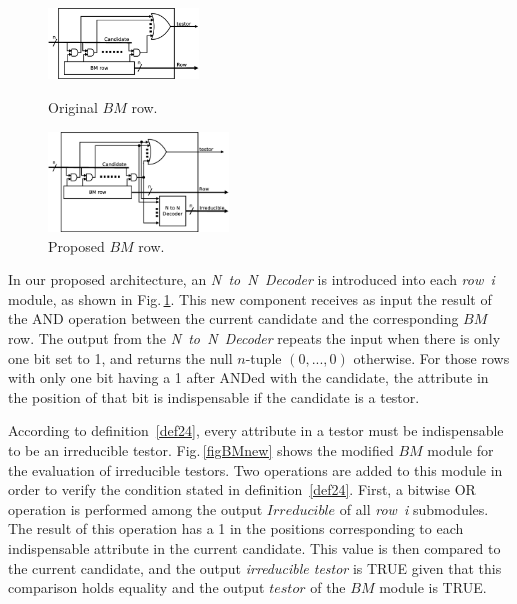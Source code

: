 \documentclass[conference]{IEEEtran}
\begin{document}
\begin{figure}[htb]
\centering
\begin{minipage}{4cm}
  \centering
   \includegraphics[width=4cm]{BM_row_old.eps}
	\caption{Original $BM$ row.}
	\label{figBMrowOld}
\end{minipage}%
\begin{minipage}{4.8cm}
  \centering
  \includegraphics[width=4.8cm]{BM_row_new.eps}
	\caption{Proposed $BM$ row.}
	\label{figBMrowNew}
\end{minipage}
\end{figure}

%

In our proposed architecture, an \textit{N~to~N~Decoder} is introduced into each 
\textit{row~i} module, as shown in Fig.\,\ref{figBMrowNew}. This new component receives as input 
the result of the AND operation between the current candidate and the corresponding $BM$ row.
The output from the \textit{N~to~N~Decoder} repeats the input when there is only one bit set
to 1, and returns the null $n$-tuple $(0,...,0)$ otherwise. For those rows with only one bit having a 1 after ANDed with the candidate, the attribute in the position of that bit is indispensable if the candidate is a testor.

According to definition~\ref{def24}, every attribute in a testor must be indispensable to be an
irreducible testor. Fig.\,\ref{figBMnew} shows the modified $BM$ module for the evaluation of 
irreducible testors. Two operations are added to this module in order to verify the condition stated in 
definition~\ref{def24}. First, a bitwise OR operation is performed among the output $Irreducible$ of all 
\textit{row~i} submodules. The result of this operation has a 1 in the positions corresponding to each 
indispensable attribute in the current candidate. This value is then compared to the current candidate, 
and the output \textit{irreducible testor} is TRUE given that this comparison holds equality and 
the output $testor$ of the $BM$ module is TRUE.
\end{document}
